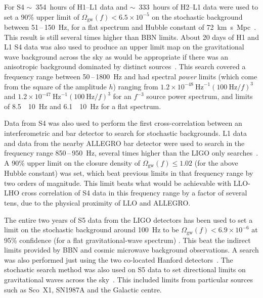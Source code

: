 For S4 $\sim$~354~hours of H1--L1 data and $\sim$~333~hours of H2--L1 data were
used to set a 90\% upper limit of $\Omega_{\mathrm{gw}}(f) < 6.5\times10^{-5}$ on
the stochastic background between 51\,--\,150~Hz, for a flat spectrum and Hubble
constant of 72~km~s~Mpc~\cite{Abbott:2007e}. This result is
still several times higher than BBN limits. About 20 days of H1 and L1 S4 data
was also used to produce an upper limit map on the gravitational wave background
across the sky as would be appropriate if there was an anisotropic background
dominated by distinct sources~\cite{Abbott:2007f}. This search covered a
frequency range between 50\,--\,1800~Hz and had spectral \textit{power} limits (which
come from the square of the amplitude $h$) ranging from
$1.2\times10^{-48} \mathrm{\ Hz}^{-1} (100 \mathrm{\ Hz}/f)^3$ and
$1.2\times10^{-47} \mathrm{\ Hz}^{-1} (100 \mathrm{\ Hz}/f)^3$ for an
$f^{-3}$ source power spectrum, and limits of
8.5~\texttimes~10~Hz and
6.1~\texttimes~10~Hz for a flat spectrum.

Data from S4 was also used to perform the first cross-correlation between an
interferometric and bar detector to search for stochastic backgrounds. L1 data
and data from the nearby ALLEGRO bar detector were used to search in the
frequency range 850\,--\,950~Hz, several times higher than the LIGO only
searches~\cite{Abbott:2007g}. A 90\% upper limit on the closure
density of $\Omega_{\mathrm{gw}}(f) \leq 1.02$ (for the above Hubble
constant) was set, which beat previous limits in that frequency range
by two orders of magnitude. This limit beats what would be achievable
with LLO-LHO cross correlation of S4 data in this frequency range by a
factor of several tens, due to the physical proximity of LLO and ALLEGRO.

The entire two years of S5 data from the LIGO detectors has been used to set a
limit on the stochastic background around 100~Hz to be $\Omega_{\mathrm{gw}}(f) <
6.9\times10^{-6}$ at 95\% confidence (for a flat gravitational-wave spectrum)
\cite{Abbott:2009b}. This beat the indirect limits provided by BBN and cosmic microwave background observations.
A search was also performed just using the two co-located Hanford detectors~\cite{2015PhRvD..91b2003A}.
The stochastic search method was also used on S5 data to set directional
limits on gravitational waves across the sky~\cite{2011PhRvL.107A1102A}. This included
limits from particular sources such as Sco~X1, SN1987A and the Galactic centre.

